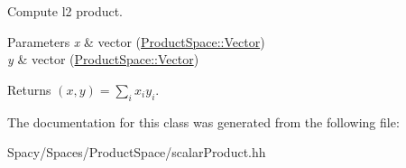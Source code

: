 Compute l2 product. 


\begin{DoxyParams}{Parameters}
{\em x} & vector (\hyperlink{classSpacy_1_1ProductSpace_1_1Vector}{Product\+Space\+::\+Vector}) \\
\hline
{\em y} & vector (\hyperlink{classSpacy_1_1ProductSpace_1_1Vector}{Product\+Space\+::\+Vector}) \\
\hline
\end{DoxyParams}
\begin{DoxyReturn}{Returns}
$(x,y) = \sum_i x_i y_i $. 
\end{DoxyReturn}


The documentation for this class was generated from the following file\+:\begin{DoxyCompactItemize}
\item 
Spacy/\+Spaces/\+Product\+Space/scalar\+Product.\+hh\end{DoxyCompactItemize}
